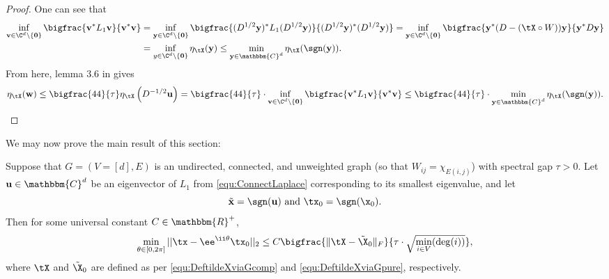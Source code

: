 \begin{proof}  
 One can see that 
\begin{align*}
\inf_{{\bf v} \in \C^d \setminus \{ \bf 0 \}} \bigfrac{{\bf v}^* L_1 {\bf v}}{{\bf v}^* {\bf v}} &= \inf_{{\bf y} \in \C^d \setminus \{ \bf 0 \}} \bigfrac{(D^{1/2}{\bf y})^* L_1 (D^{1/2} {\bf y})}{(D^{1/2}{\bf y})^*(D^{1/2} {\bf y})} = \inf_{{\bf y} \in \C^d \setminus \{ \bf 0 \} } \bigfrac{{\bf y}^*(D - (\tX \circ W)){\bf y}}{{\bf y}^* D {\bf y} } \\
&= \inf_{y \in \C^d \setminus \{ \bf 0 \}} \eta_{\tX}({\bf y}) \le \min_{{\bf y} \in \mathbbm{C}^d} \eta_{\tX}( \sgn({\bf y}) ).  
\end{align*}
From here, lemma 3.6 in \cite{Cheeger} gives \[\eta_{\tX}({\bf w}) \le \bigfrac{44}{\tau} \eta_{\tX}\left( D^{-1/2}{\bf u} \right) = \bigfrac{44}{\tau} \cdot \inf_{{\bf v} \in \C^d \setminus \{ \bf 0 \}} \bigfrac{{\bf v}^* L_1 {\bf v}}{{\bf v}^* {\bf v}} \le \bigfrac{44}{\tau} \cdot \min_{{\bf y} \in \mathbbm{C}^d} \eta_{\tX}( \sgn({\bf y}) ).\]
\end{proof}

We may now prove the main result of this section:

\begin{thm}
Suppose that $G = (V=[d], E)$ is an undirected, connected, and unweighted graph (so that $W_{ij} = \chi_{E(i, j)}$) with spectral gap $\tau > 0$.  Let ${\bf u} \in \mathbbm{C}^d$ be an eigenvector of $L_1$ from \eqref{equ:ConnectLaplace} corresponding to its smallest eigenvalue, and let \[\tilde{\bf x} = \sgn({\bf u}) \ \text{and} \ \tx_0 = \sgn(\x_0).\] Then for some universal constant $C \in \mathbbm{R}^+$, \[\min_{\theta \in [0, 2\pi]} ||\tx - \ee^{\ii \theta} \tx_0||_2 \le C \bigfrac{\|\tX - \tilde{\X}_0\|_F}{\tau \cdot \sqrt{\min_{i \in V}(\deg(i))}},\] where $\tX$ and $\tilde{\X}_0$ are defined as per \eqref{equ:DeftildeXviaGcomp} and \eqref{equ:DeftildeXviaGpure}, respectively. %
\label{thm:SpecGraphPertBound}
\end{thm}

